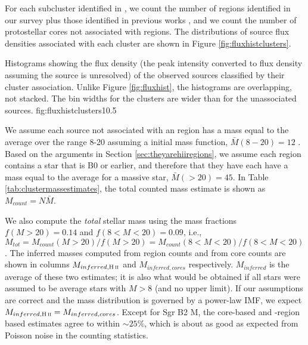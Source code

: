 \documentclass[twocolumn]{aastex61}
\begin{document}


For each subcluster identified in \citet[][see Figure
\ref{fig:overview}]{Schmiedeke2016a}, we count the number of \hii regions
identified in our survey plus those identified in previous works
\citep{Gaume1995a,de-Pree1996a}, and we count the number of protostellar cores
not associated with \hii regions.  The distributions of source flux densities
associated with each cluster are shown in Figure \ref{fig:fluxhistclusters}.

{Histograms showing the flux density (the peak intensity converted to flux density
assuming the source is unresolved) of the observed sources classified by their
cluster association.  Unlike Figure \ref{fig:fluxhist}, the histograms are
overlapping, not stacked.  The bin widths for the clusters are wider than
for the unassociated sources.}
{fig:fluxhistclusters}{1}{0.5\textwidth}


We assume each source not associated with an \hii region has a mass equal to
the average over the range 8-20 \msun assuming a \citet{Kroupa2001a} initial
mass function, $\bar{M}(8-20) = 12$ \msun.  Based on the arguments in Section
\ref{sec:theyarehiiregions}, we assume each \hii region contains a star that is
B0 or earlier, and therefore that they have each have a mass equal to the
average for a massive star, $\bar{M}(>20) = 45$.  In Table
\ref{tab:clustermassestimates}, the total counted mass estimate is shown as
$M_{count} = N \bar{M}$.

We also compute the \emph{total} stellar mass using the mass fractions $f(M>20)
= 0.14$ and $f(8<M<20)=0.09$, i.e., $M_{tot} = M_{count}(M>20) / f(M>20) =
M_{count}(8<M<20) / f(8<M<20)$.  The inferred masses computed from \hii region
counts and from core counts are shown in columns $M_{inferred,\hii}$ and
$M_{inferred,cores}$ respectively. $M_{inferred}$ is the average of these two
estimates; it is also what would be obtained if all stars were assumed to be
average stars with $M>8$ \msun (and no upper limit).  If our assumptions are
correct and the mass distribution is governed by a power-law IMF, we expect
$M_{inferred,\hii} = M_{inferred,cores}$.  Except for Sgr B2 M, the core-based
and \hii-region based estimates agree to within $\sim25\%$, which is about as
good as expected from Poisson noise in the counting statistics.  
\end{document}
